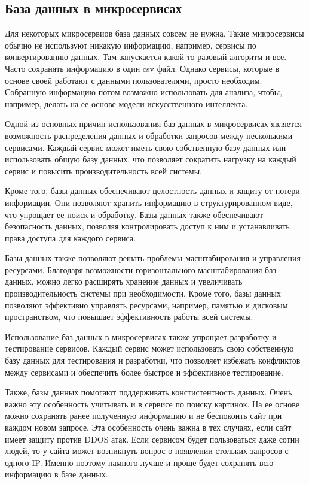\subsection{База данных в микросервисах}
Для некоторых микросервиов база данных совсем не нужна.
Такие микросервисы обычно не используют никакую информацию, например, сервисы по конвертированию данных.
Там запускается какой-то разовый алгоритм и все.
Часто сохранять информацию в один csv файл.
Однако сервисы, которые в основе своей работают с данными пользователями, просто необходим.
Собранную информацию потом возможно использовать для анализа, чтобы, например, делать на ее основе модели искусственного интеллекта.

Одной из основных причин использования баз данных в микросервисах является возможность распределения данных и обработки запросов между несколькими сервисами.
Каждый сервис может иметь свою собственную базу данных или использовать общую базу данных, что позволяет сократить нагрузку на каждый сервис и повысить производительность всей системы.

Кроме того, базы данных обеспечивают целостность данных и защиту от потери информации. 
Они позволяют хранить информацию в структурированном виде, что упрощает ее поиск и обработку.
Базы данных также обеспечивают безопасность данных, позволяя контролировать доступ к ним и устанавливать права доступа для каждого сервиса.

Базы данных также позволяют решать проблемы масштабирования и управления ресурсами. 
Благодаря возможности горизонтального масштабирования баз данных, можно легко расширять хранение данных и увеличивать производительность системы при необходимости. 
Кроме того, базы данных позволяют эффективно управлять ресурсами, например, памятью и дисковым пространством, что повышает эффективность работы всей системы.

Использование баз данных в микросервисах также упрощает разработку и тестирование сервисов. 
Каждый сервис может использовать свою собственную базу данных для тестирования и разработки, что позволяет избежать конфликтов между сервисами и обеспечить более быстрое и эффективное тестирование.

Также, базы данных помогают поддерживать констистентность данных. Очень важно эту особенность учитывать и в сервисе по поиску картинок.
На ее основе можно сохранять ранее полученную информацию и не беспокоить сайт при каждом новом запросе.
Эта особенность очень важна в тех случаях, если сайт имеет защиту против DDOS атак.
Если сервисом будет пользоваться даже сотни людей, то у сайта может возникнуть вопрос о появлении стольких запросов с одного IP.
Именно поэтому намного лучше и проще будет сохранять всю информацию в базе данных.

